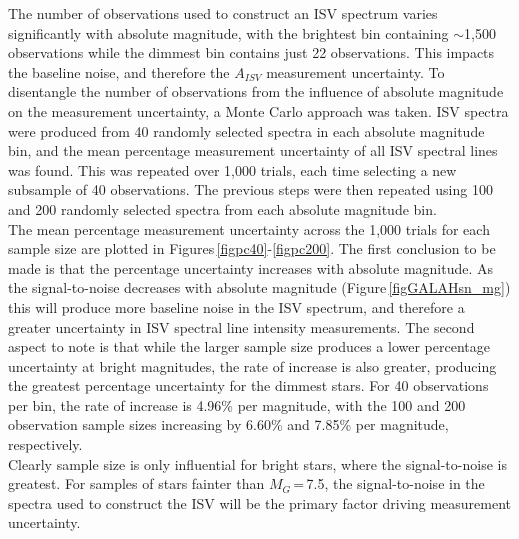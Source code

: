 The number of observations used to construct an ISV spectrum varies significantly with absolute magnitude, with the brightest bin containing $\sim$1,500 observations while the dimmest bin contains just 22 observations. This impacts the baseline noise, and therefore the $A_{ISV}$ measurement uncertainty. To disentangle the number of observations from the influence of absolute magnitude on the measurement uncertainty, a Monte Carlo approach was taken. ISV spectra were produced from 40 randomly selected spectra in each absolute magnitude bin, and the mean percentage measurement uncertainty of all ISV spectral lines was found. This was repeated over 1,000 trials, each time selecting a new subsample of 40 observations. The previous steps were then repeated using 100 and 200 randomly selected spectra from each absolute magnitude bin.\\

The mean percentage measurement uncertainty across the 1,000 trials for each sample size are plotted in Figures\,\ref{figpc40}-\ref{figpc200}. The first conclusion to be made is that the percentage uncertainty increases with absolute magnitude. As the signal-to-noise decreases with absolute magnitude (Figure\,\ref{figGALAHsn_mg}) this will produce more baseline noise in the ISV spectrum, and therefore a greater uncertainty in ISV spectral line intensity measurements. The second aspect to note is that while the larger sample size produces a lower percentage uncertainty at bright magnitudes, the rate of increase is also greater, producing the greatest percentage uncertainty for the dimmest stars. For 40 observations per bin, the rate of increase is 4.96\% per magnitude, with the 100 and 200 observation sample sizes increasing by 6.60\% and 7.85\% per magnitude, respectively.\\

Clearly sample size is only influential for bright stars, where the signal-to-noise is greatest. For samples of stars fainter than $M_G$\,=\,7.5, the signal-to-noise in the spectra used to construct the ISV will be the primary factor driving measurement uncertainty.\\

